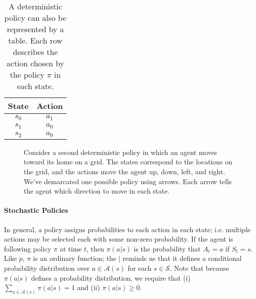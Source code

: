 \documentclass[12pt]{article}
\begin{document}
\begin{table}[h]
  \centering
  \begin{tabular}{|c | c|}
    \hline
    State & Action \\
    \hline
    $s_0$ & $a_1$ \\
    \hline
    $s_1$ & $a_0$ \\
    \hline
    $s_2$ & $a_0$ \\
    \hline
  \end{tabular}
  \caption{\footnotesize A deterministic policy can also be represented by a table. Each row describes the action chosen by the policy $\pi$ in each state.}
\end{table}

\begin{figure}[h]
  \centering
  \caption{\footnotesize Consider a second deterministic policy in which an agent moves toward its home on a grid. The states correspond to the locations on the grid, and the actions move the agent up, down, left, and right. We've demarcated one possible policy using arrows. Each arrow tells the agent which direction to move in each state.}
\end{figure}

\paragraph{Stochastic Policies}
In general, a policy assigns probabilities to each action in each state; i.e. multiple actions may be selected each with some non-zero probability. If the agent is following policy $\pi$ at time $t$, then $\pi(a|s)$ is the probability that $A_t = a$ if $S_t = s$. Like $p$, $\pi$ is an ordinary function; the $|$ reminds us that it defines a conditional probability distribution over $a \in \mathcal A(s)$ for each $s \in \mathcal S$. Note that because $\pi(a|s)$ defines a probability distribution, we require that (i) $\sum_{a \in \mathcal A(s)} \pi(a|s) = 1$ and (ii) $\pi(a|s) \geq 0$.
\end{document}
